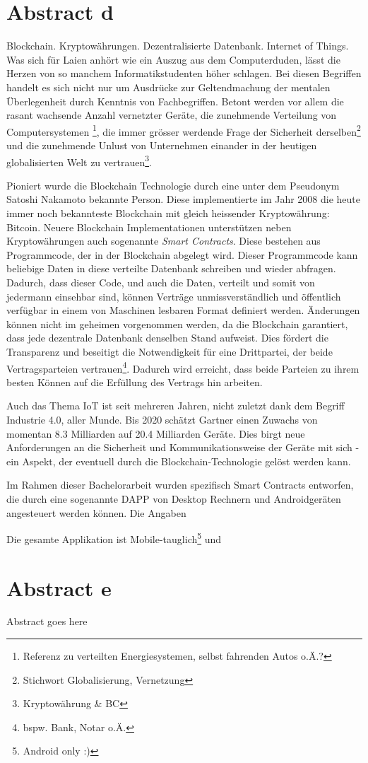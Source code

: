 \chapter{Abstract d}
\label{cha:abstract_d}
Blockchain. Kryptowährungen. Dezentralisierte Datenbank. Internet of Things. Was sich für Laien anhört wie ein Auszug aus dem Computerduden, lässt die Herzen von so manchem Informatikstudenten höher schlagen. Bei diesen Begriffen handelt es sich nicht nur um Ausdrücke zur Geltendmachung der mentalen Überlegenheit durch Kenntnis von Fachbegriffen. Betont werden vor allem die rasant wachsende Anzahl vernetzter Geräte, die zunehmende Verteilung von Computersystemen \footnote{Referenz zu verteilten Energiesystemen, selbst fahrenden Autos o.Ä.?}, die immer grösser werdende Frage der Sicherheit derselben\footnote{Stichwort Globalisierung, Vernetzung} und die zunehmende Unlust von Unternehmen einander in der heutigen globalisierten Welt zu vertrauen\footnote{Kryptowährung \& BC}.

Pioniert wurde die Blockchain Technologie durch eine unter dem Pseudonym Satoshi Nakamoto bekannte Person. Diese implementierte im Jahr 2008 die heute immer noch bekannteste Blockchain mit gleich heissender Kryptowährung: Bitcoin. Neuere Blockchain Implementationen unterstützen neben Kryptowährungen auch sogenannte \emph{Smart Contracts}. Diese bestehen aus Programmcode, der in der Blockchain abgelegt wird. Dieser Programmcode kann beliebige Daten in diese verteilte Datenbank schreiben und wieder abfragen. Dadurch, dass dieser Code, und auch die Daten, verteilt und somit von jedermann einsehbar sind, können Verträge unmissverständlich und öffentlich verfügbar in einem von Maschinen lesbaren Format definiert werden. Änderungen können nicht im geheimen vorgenommen werden, da die Blockchain garantiert, dass jede dezentrale Datenbank denselben Stand aufweist. Dies fördert die Transparenz und beseitigt die Notwendigkeit für eine Drittpartei, der beide Vertragsparteien vertrauen\footnote{bspw. Bank, Notar o.Ä.}. Dadurch wird erreicht, dass beide Parteien zu ihrem besten Können auf die Erfüllung des Vertrags hin arbeiten.

Auch das Thema \acrshort{IoT} ist seit mehreren Jahren, nicht zuletzt dank dem Begriff Industrie 4.0, aller Munde. Bis 2020 schätzt Gartner einen Zuwachs von momentan 8.3 Milliarden auf 20.4 Milliarden Geräte. Dies birgt neue Anforderungen an die Sicherheit und Kommunikationsweise der Geräte mit sich - ein Aspekt, der eventuell durch die Blockchain-Technologie gelöst werden kann.\cite{gartner.com_iot,BlockchainRevolution}

Im Rahmen dieser Bachelorarbeit wurden spezifisch Smart Contracts entworfen, die durch eine sogenannte \acrfull{DAPP} von Desktop Rechnern und Androidgeräten angesteuert werden können. Die Angaben 

Die gesamte Applikation ist Mobile-tauglich\footnote{Android only :)} und 




\chapter{Abstract e}
\label{cha:abstract_e}

Abstract goes here
